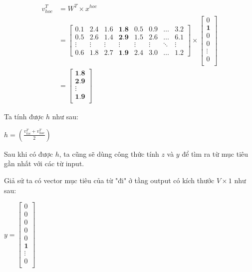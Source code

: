 \begin{center}
    \begin{equation}
        \begin{split}
            v^T_{hoc} & = W^T\times x^{hoc} \\
            & =
            \begin{bmatrix}
                0.1 & 2.4 & 1.6 & \textbf{1.8} & 0.5 & 0.9 & \dots & 3.2 \\
                0.5 & 2.6 & 1.4 & \textbf{2.9} & 1.5 & 2.6 & \dots & 6.1 \\
                \vdots & \vdots & \vdots & \vdots & \vdots & \vdots & \ddots & \vdots \\
                0.6 & 1.8 & 2.7 & \textbf{1.9} & 2.4 & 3.0 & \dots & 1.2
            \end{bmatrix} \times
            \begin{bmatrix}
                0\\
                \textbf{1} \\
                0 \\
                0 \\
                \vdots \\
                0 \\
            \end{bmatrix} \\
            & =
            \begin{bmatrix}
                \textbf{1.8} \\
                \textbf{2.9} \\
                \vdots \\
                \textbf{1.9} \\
            \end{bmatrix}
        \end{split}
    \end{equation}
\end{center}

Ta tính được $h$ như sau:
\begin{center}
    $h = \left( \frac{v^T_{toi} + v^T_{hoc}}{2} \right)$
\end{center}

Sau khi có được $h$, ta cũng sẽ dùng công thức tính $z$ và $y$ để tìm ra từ mục tiêu gần nhất với các từ input.

Giả sử ta có vector mục tiêu của từ "đi" ở tầng output có kích thước $V\times 1$ như sau:
\begin{center}
    $y =
    \begin{bmatrix}
        0 \\
        0 \\
        0 \\
        0 \\
        0 \\
        \textbf{1} \\
        \vdots \\
        0 \\
    \end{bmatrix}
    $
\end{center}

